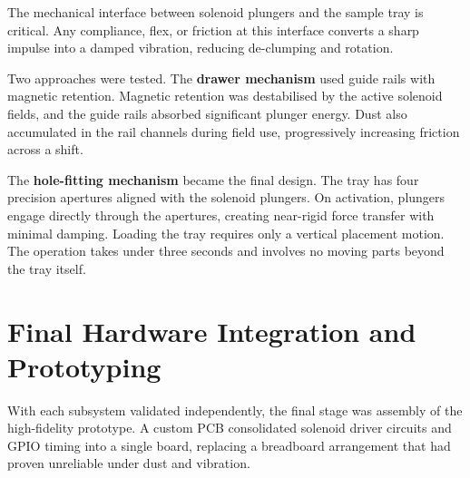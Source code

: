 The mechanical interface between solenoid plungers and the sample tray is critical. Any compliance, flex, or friction at this interface converts a sharp impulse into a damped vibration, reducing de-clumping and rotation.

Two approaches were tested. The \textbf{drawer mechanism} used guide rails with magnetic retention. Magnetic retention was destabilised by the active solenoid fields, and the guide rails absorbed significant plunger energy. Dust also accumulated in the rail channels during field use, progressively increasing friction across a shift.

The \textbf{hole-fitting mechanism} became the final design. The tray has four precision apertures aligned with the solenoid plungers. On activation, plungers engage directly through the apertures, creating near-rigid force transfer with minimal damping. Loading the tray requires only a vertical placement motion. The operation takes under three seconds and involves no moving parts beyond the tray itself.

\section{Final Hardware Integration and Prototyping}

With each subsystem validated independently, the final stage was assembly of the high-fidelity prototype. A custom PCB consolidated solenoid driver circuits and GPIO timing into a single board, replacing a breadboard arrangement that had proven unreliable under dust and vibration.

